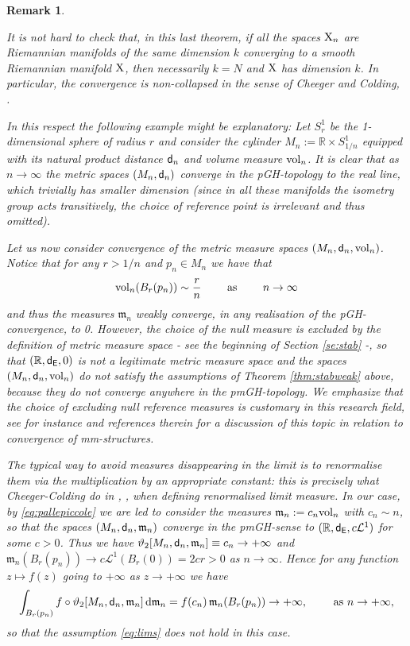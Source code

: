 \documentclass[reqno,11pt]{article}
\numberwithin{equation}{section}
\newcommand{\R}{\mathbb{R}}
\newcommand{\mm}{{\mbox{\boldmath$m$}}}
\newcommand{\sfd}{{\sf d}}
\renewcommand{\d}{{\mathrm d}}
\renewcommand{\mm}{\mathfrak m}                                %
\newtheorem{remark}[theorem]{Remark}
\newcommand{\X}{{\rm X}}
\newcommand{\Eu}{{\sf E}}
\begin{document}
\begin{remark}\label{re:comm}{\rm It is not hard to check that, in  this last theorem, if all the spaces $\X_n$ are Riemannian manifolds of  the same dimension $k$ converging to a smooth Riemannian manifold \(\X\), then necessarily \(k=N\) and  \(\X\) has dimension \(k\). In particular, the convergence is non-collapsed in the sense of Cheeger and Colding, \cite{Cheeger-Colding97I}.


In this respect the following example might be explanatory:  Let $S^1_r$ be the 1-dimensional sphere of radius $r$ and consider the cylinder $M_n:=\R\times S^1_{1/n}$ equipped with its natural product distance $\sfd_n$ and volume measure ${\rm vol}_n$. It is clear that as $n\to\infty$ the metric spaces $(M_n,\sfd_n)$ converge in the pGH-topology to the real line, which trivially has smaller dimension (since in all these manifolds the isometry group acts transitively, the  choice of reference point is irrelevant and thus omitted). 

Let us now consider convergence of the metric \emph{measure} spaces $(M_n,\sfd_n,{\rm vol}_n)$. Notice that  for any $r>1/n$ and $p_n\in M_n$ we have that 
\begin{equation}
\label{eq:pallepiccole}
{\rm vol}_n(B_r(p_n))\sim \frac rn\qquad\text{ as }\qquad n\to\infty
\end{equation}
and thus the measures $\mm_n$ weakly converge, in any realisation of the pGH-convergence, to 0. However, the choice of the null measure is excluded by the definition of metric measure space - see the beginning of Section \ref{se:stab} -, so that $(\R,\sfd_{\Eu},0)$ is not a legitimate metric measure space and the spaces $(M_n,\sfd_n,{\rm vol}_n)$ do not satisfy the assumptions of Theorem \ref{thm:stabweak} above, because they do not converge anywhere in the pmGH-topology. We emphasize that the choice of excluding null reference measures is customary in this research field, see for instance \cite{GMS15} and references therein for a discussion of this topic in relation to convergence of mm-structures.

The typical way to avoid measures disappearing in the limit is to renormalise them via the multiplication by an appropriate constant: this is precisely what Cheeger-Colding do in \cite{Cheeger-Colding97I}, \cite{Cheeger-Colding97II}, \cite{Cheeger-Colding97III} when defining renormalised limit measure. In our case, by \eqref{eq:pallepiccole} we are led to consider the measures $\mm_n:=c_n{\rm vol}_n$ with $c_n\sim n$, so that the spaces $(M_n,\sfd_n,\mm_n)$ converge in the pmGH-sense to $(\R,\sfd_\Eu,c\mathcal L^1)$ for some $c>0$. Thus  we have $\vartheta_2[M_n,\sfd_n,\mm_n]\equiv c_n\to+\infty$ and $\mm_n(B_r(p_n))\to c\mathcal L^1(B_r(0))=2cr>0$ as $n\to\infty$. Hence for  any  function $z\mapsto f(z)$ going to $+\infty$ as $z\to+\infty$ we have
\[
\int_{B_r(p_n)}f\circ\vartheta_2[M_n,\sfd_n,\mm_n]\,\d\mm_n=f(c_n)\,\mm_n(B_r(p_n))\to+\infty,\qquad\text{ as }n\to+\infty,
\]
so that the assumption \eqref{eq:lims} does not hold in this case.

}
\end{remark}
\end{document}
